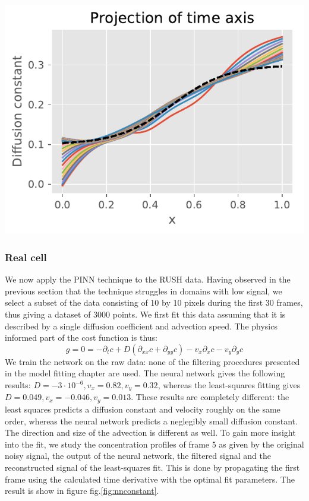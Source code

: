 \documentclass{Dissertate}
\let\origfigure\figure
\let\endorigfigure\endfigure
\renewenvironment{figure}[1][2] {
    \expandafter\origfigure\expandafter[H]
} {
    \endorigfigure
}
\begin{document}
\begin{figure}
\hypertarget{fig:projectionD}{%
\centering
\includegraphics{source/figures/pdf/projection.pdf}
\caption{Projection of the inferred diffusion profile along the time
axis.}\label{fig:projectionD}
}
\end{figure}

\hypertarget{real-cell}{%
\subsubsection{Real cell}\label{real-cell}}

We now apply the PINN technique to the RUSH data. Having observed in the
previous section that the technique struggles in domains with low
signal, we select a subset of the data consisting of 10 by 10 pixels
during the first 30 frames, thus giving a dataset of 3000 points. We
first fit this data assuming that it is described by a single diffusion
coefficient and advection speed. The physics informed part of the cost
function is thus: \[
g=0=-\partial_tc+D(\partial_{xx}c+\partial_{yy}c)-v_x\partial_xc-v_y\partial_yc
\] We train the network on the raw data: none of the filtering
procedures presented in the model fitting chapter are used. The neural
network gives the following results:
\(D=-3\cdot10^{-6}, v_x=0.82, v_y=0.32\), whereas the least-squares
fitting gives \(D=0.049, v_x=-0.046, v_y=0.013\). These results are
completely different: the least squares predicts a diffusion constant
and velocity roughly on the same order, whereas the neural network
predicts a neglegibly small diffusion constant. The direction and size
of the advection is different as well. To gain more insight into the
fit, we study the concentration profiles of frame 5 as given by the
original noisy signal, the output of the neural network, the filtered
signal and the reconstructed signal of the least-squares fit. This is
done by propagating the first frame using the calculated time derivative
with the optimal fit parameters. The result is show in figure
fig.\ref{fig:nnconstant}.
\end{document}
